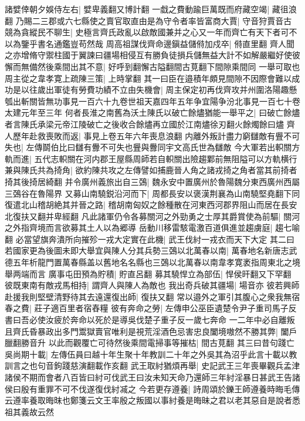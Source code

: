 諸嬖倖朝夕娛侍左右|{
	嬖卑義翻又博計翻}
一戱之費動踰巨萬既而府藏空竭|{
	藏徂浪翻}
乃賜二三郡或六七縣使之賣官取直由是為守令者率皆富商大賈|{
	守音狩賈音古}
競為貪縱民不聊生|{
	史極言齊氏政亂以啟敵國兼并之心又一年而齊亡有天下者可不以為鑒乎書名通鑑豈苟然哉}
周高祖謀伐齊命邊鎭益儲偫加戍卒|{
	偫直里翻}
齊人聞之亦增脩守禦柱國于翼諫曰疆場相侵互有勝負徒損兵儲無益大計不如解嚴繼好使彼懈而無備然後乘間出其不意|{
	好呼到翻懈古隘翻間古莧翻下間隙乘間同}
一舉可取也周主從之韋孝寛上疏陳三策|{
	上時掌翻}
其一曰臣在邉積年頗見間隙不因際會難以成功是以往歲出軍徒有勞費功績不立由失機會|{
	周主保定初再伐齊攻并州圍洛陽趣懸瓠出斬關皆無功事見一百六十九卷世祖天嘉四年五年争宜陽争汾北事見一百七十卷太建元年至三年}
何者長淮之南舊為沃土陳氏以破亡餘燼猶能一舉平之|{
	曰破亡餘燼者言陳氏承梁元帝江陵破亡之後收合餘燼再立國於江南燼徐刃翻火餘燭餘曰燼}
齊人歷年赴救喪敗而返|{
	事見上卷五年六年喪息浪翻}
内離外叛計盡力窮讎敵有舋不可失也|{
	左傳鬬伯比曰讎有釁不可失也舋與釁同宇文高氏世為讎敵}
今大軍若出軹關方軌而進|{
	五代志軹關在河内郡王屋縣周師若自軹關出險趨鄴前無阻隘可以方軌横行}
兼與陳氏共為掎角|{
	欲約陳共攻之左傳譬如捕鹿晉人角之諸戎掎之角者當其前掎者掎其後掎居綺翻}
并令廣州義旅出自三鵶|{
	魏永安中置廣州於魯陽魏分東西廣州西屬三鵶谷在魯陽界}
又募山南驍鋭沿河而下|{
	周都長安以褒漢荆襄為山南驍堅堯翻下同}
復遣北山稽胡絶其并晉之路|{
	稽胡南匈奴之餘種散在河東西河郡界阻山而居在長安北復扶又翻并卑經翻}
凡此諸軍仍令各募關河之外勁勇之士厚其爵賞使為前驅|{
	關河之外指齊境而言欲募其土人以為郷導}
岳動川移雷駭電激百道俱進並趨虜庭|{
	趨七喻翻}
必當望旗奔潰所向摧殄一戎大定實在此機|{
	武王伐紂一戎衣而天下大定}
其二曰若國家更為後圖未即大舉宜與陳人分其兵勢三鵶以北萬春以南|{
	萬春地名新唐志武德五年析龍門置萬春縣盖以舊地名名縣也三鵶以北萬春以南韋孝寛袤指周東北之境舉两端而言}
廣事屯田預為貯積|{
	貯直呂翻}
募其驍悍立為部伍|{
	悍侯旰翻又下罕翻}
彼既東南有敵戎馬相持|{
	謂齊人與陳人為敵也}
我出奇兵破其疆場|{
	場音亦}
彼若興師赴援我則堅壁清野待其去遠還復出師|{
	復扶又翻}
常以邉外之軍引其腹心之衆我無宿春之費|{
	莊子適百里者宿舂糧}
彼有奔命之勞|{
	左傳申公巫臣遺楚令尹子重司馬子反書曰吾必使汝疲於奔命以死於是導吳伐楚子重子反一歲七奔命}
一二年中必自離叛且齊氏昏暴政出多門鬻獄賣官唯利是視荒淫酒色忌害忠良闔境嗷然不勝其弊|{
	闔戶臘翻勝音升}
以此而觀覆亡可待然後乘間電掃事等摧枯|{
	間古莧翻}
其三曰昔句踐亡吳尚期十載|{
	左傳伍員曰越十年生聚十年教訓二十年之外吳其為沼乎此言十載以教訓言之也句音鉤踐慈演翻載作亥翻}
武王取紂猶煩再舉|{
	史記武王三年喪畢觀兵孟津諸侯不期而會者八百皆曰紂可伐武王曰汝未知天命乃還師三年紂淫暴日甚武王告諸侯曰殷有重罪不可不伐遂復伐紂㓕之}
今若更存遵養|{
	詩周頌於鑠王師遵養時晦毛傳云遵率養取晦昩也鄭箋云文王率殷之叛國以事紂養是晦昧之君以老其惡自是說者悉祖其義故云然}
